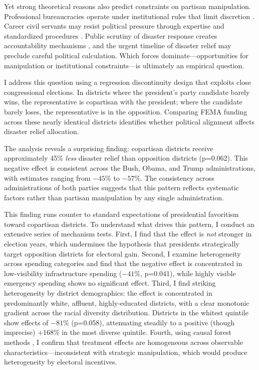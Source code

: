 \documentclass[12pt,letterpaper,oneside]{book}
\begin{document}
Yet strong theoretical reasons also predict constraints on partisan manipulation. Professional bureaucracies operate under institutional rules that limit discretion \citep{north1990institutions, ostrom2005understanding}. Career civil servants may resist political pressure through expertise and standardized procedures \citep{carpenter2001forging}. Public scrutiny of disaster response creates accountability mechanisms \citep{healy2009myopic, gasper2011make}, and the urgent timeline of disaster relief may preclude careful political calculation. Which forces dominate---opportunities for manipulation or institutional constraints---is ultimately an empirical question.

I address this question using a regression discontinuity design that exploits close congressional elections. In districts where the president's party candidate barely wins, the representative is copartisan with the president; where the candidate barely loses, the representative is in the opposition. Comparing FEMA funding across these nearly identical districts identifies whether political alignment affects disaster relief allocation.

The analysis reveals a surprising finding: copartisan districts receive approximately 45\% \emph{less} disaster relief than opposition districts (p=0.062). This negative effect is consistent across the Bush, Obama, and Trump administrations, with estimates ranging from $-45\%$ to $-57\%$. The consistency across administrations of both parties suggests that this pattern reflects systematic factors rather than partisan manipulation by any single administration.

This finding runs counter to standard expectations of presidential favoritism toward copartisan districts. To understand what drives this pattern, I conduct an extensive series of mechanism tests. First, I find that the effect is \emph{not} stronger in election years, which undermines the hypothesis that presidents strategically target opposition districts for electoral gain. Second, I examine heterogeneity across spending categories and find that the negative effect is concentrated in low-visibility infrastructure spending ($-41\%$, p=0.041), while highly visible emergency spending shows no significant effect. Third, I find striking heterogeneity by district demographics: the effect is concentrated in predominantly white, affluent, highly-educated districts, with a clear monotonic gradient across the racial diversity distribution. Districts in the whitest quintile show effects of $-81\%$ (p=0.058), attenuating steadily to a positive (though imprecise) $+168\%$ in the most diverse quintile. Fourth, using causal forest methods \citep{wager2018estimation}, I confirm that treatment effects are homogeneous across observable characteristics---inconsistent with strategic manipulation, which would produce heterogeneity by electoral incentives.
\end{document}
